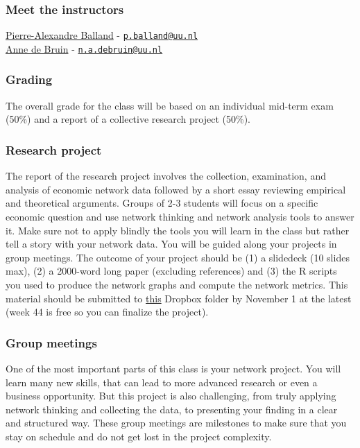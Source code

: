 \documentclass[
]{article}
\begin{document}
\hypertarget{meet-the-instructors}{%
\subsubsection{Meet the instructors}\label{meet-the-instructors}}

\href{https://www.paballand.com/}{Pierre-Alexandre Balland} -
\href{mailto:p.balland@uu.nl}{\nolinkurl{p.balland@uu.nl}}\\
\href{n.a.debruin@uu.nl}{Anne de Bruin} -
\href{mailto:n.a.debruin@uu.nl}{\nolinkurl{n.a.debruin@uu.nl}}

\hypertarget{grading}{%
\subsubsection{Grading}\label{grading}}

The overall grade for the class will be based on an individual mid-term
exam (50\%) and a report of a collective research project (50\%).

\hypertarget{research-project}{%
\subsubsection{Research project}\label{research-project}}

The report of the research project involves the collection, examination,
and analysis of economic network data followed by a short essay
reviewing empirical and theoretical arguments. Groups of 2-3 students
will focus on a specific economic question and use network thinking and
network analysis tools to answer it. Make sure not to apply blindly the
tools you will learn in the class but rather tell a story with your
network data. You will be guided along your projects in group meetings.
The outcome of your project should be (1) a slidedeck (10 slides max),
(2) a 2000-word long paper (excluding references) and (3) the R scripts
you used to produce the network graphs and compute the network metrics.
This material should be submitted to
\href{https://www.dropbox.com/request/LwSV7hxd0i4qTatae9hZ}{this}
Dropbox folder by November 1 at the latest (week 44 is free so you can
finalize the project).

\hypertarget{group-meetings}{%
\subsubsection{Group meetings}\label{group-meetings}}

One of the most important parts of this class is your network project.
You will learn many new skills, that can lead to more advanced research
or even a business opportunity. But this project is also challenging,
from truly applying network thinking and collecting the data, to
presenting your finding in a clear and structured way. These group
meetings are milestones to make sure that you stay on schedule and do
not get lost in the project complexity.
\end{document}
